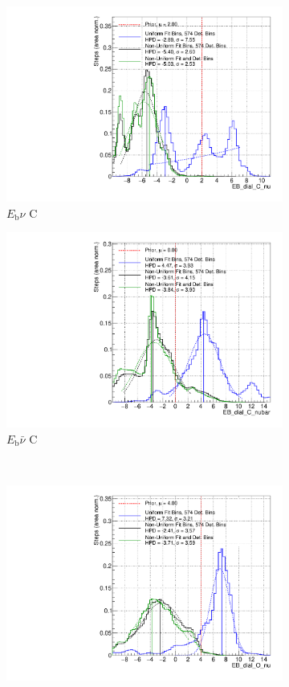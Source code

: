 \begin{figure}
\centering
\begin{subfigure}{.48\textwidth}
  \centering
  \includegraphics[width=0.73\linewidth]{figs/PolyComp_EB_dial_C_nu}
  \caption{$E_{\mathrm{b}}\nu$ C}
\end{subfigure}
\begin{subfigure}{.48\textwidth}
  \centering
  \includegraphics[width=0.73\linewidth]{figs/PolyComp_EB_dial_C_nubar}
  \caption{$E_{\mathrm{b}}\bar{\nu}$ C}
\end{subfigure} \\
\begin{subfigure}{.48\textwidth}
  \centering
  \includegraphics[width=0.73\linewidth]{figs/PolyComp_EB_dial_O_nu}

\end{subfigure}
\end{figure}
